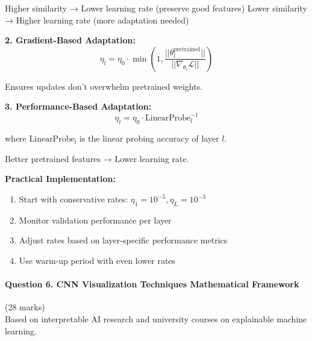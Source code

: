 \documentclass[12pt]{article}
\begin{document}
\begin{enumerate}[(a)]
{    Higher similarity → Lower learning rate (preserve good features)
    Lower similarity → Higher learning rate (more adaptation needed)
    
    \textbf{2. Gradient-Based Adaptation:}
    $$\eta_l = \eta_0 \cdot \min\left(1, \frac{||\theta_l^{\text{pretrained}}||}{||\nabla_{\theta_l} \mathcal{L}||}\right)$$
    
    Ensures updates don't overwhelm pretrained weights.
    
    \textbf{3. Performance-Based Adaptation:}
    $$\eta_l = \eta_0 \cdot \text{LinearProbe}_l^{-1}$$
    
    where $\text{LinearProbe}_l$ is the linear probing accuracy of layer $l$.
    
    Better pretrained features → Lower learning rate.
    
    \textbf{Practical Implementation:}
    \begin{enumerate}
        \item Start with conservative rates: $\eta_1 = 10^{-5}, \eta_L = 10^{-3}$
        \item Monitor validation performance per layer
        \item Adjust rates based on layer-specific performance metrics
        \item Use warm-up period with even lower rates
    \end{enumerate}
    }
\end{enumerate}

\newpage
\paragraph{Question 6. CNN Visualization Techniques Mathematical Framework}{{\hfill (28 marks)}}\\
Based on interpretable AI research and university courses on explainable machine learning.
\end{document}

